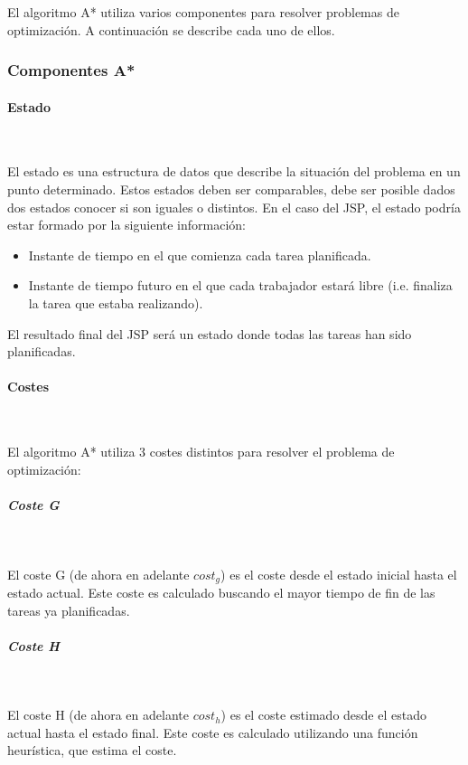 El algoritmo A* utiliza varios componentes para resolver problemas
de optimización. A continuación se describe cada uno de ellos.

\pagebreak

\subsubsection{Componentes A*}

\paragraph{Estado}~

El estado es una estructura de datos que describe la situación
del problema en un punto determinado.
Estos estados deben ser comparables,
debe ser posible dados dos estados conocer si son iguales o distintos.
En el caso del JSP, el estado podría estar formado por la siguiente información:

\begin{itemize}[itemsep=0.25px]
    \item Instante de tiempo en el que comienza cada tarea planificada.
    \item Instante de tiempo futuro en el que cada trabajador estará libre
    (i.e. finaliza la tarea que estaba realizando).
\end{itemize}

El resultado final del JSP será un estado donde todas las tareas han sido planificadas.

\paragraph{Costes}~

El algoritmo A* utiliza 3 costes distintos para resolver el problema de optimización:

\subparagraph{Coste G}~

El coste G (de ahora en adelante $cost_g$) es el coste desde el estado inicial
hasta el estado actual.
Este coste es calculado buscando el mayor tiempo de fin de
las tareas ya planificadas.

\subparagraph{Coste H}~

El coste H (de ahora en adelante $cost_h$) es el coste estimado desde el estado actual
hasta el estado final.
Este coste es calculado utilizando una función heurística,
que estima el coste.

